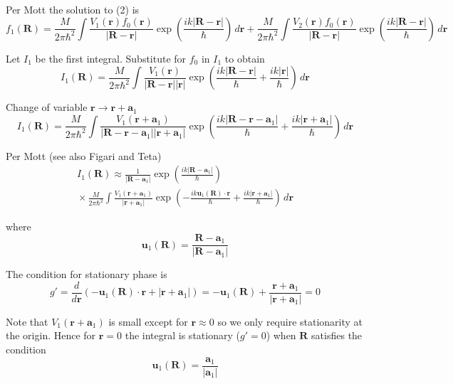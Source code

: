 Per Mott the solution to (2) is
\begin{equation*}
f_1(\mathbf R)=
\frac{M}{2\pi\hbar^2}\int\frac{V_1(\mathbf r)f_0(\mathbf r)}{|\mathbf R-\mathbf r|}
\exp\left(\frac{ik|\mathbf R-\mathbf r|}{\hbar}\right)\,d\mathbf r
+\frac{M}{2\pi\hbar^2}\int\frac{V_2(\mathbf r)f_0(\mathbf r)}{|\mathbf R-\mathbf r|}
\exp\left(\frac{ik|\mathbf R-\mathbf r|}{\hbar}\right)\,d\mathbf r
\end{equation*}

Let $I_1$ be the first integral.
Substitute for $f_0$ in $I_1$ to obtain
\begin{equation*}
I_1(\mathbf R)=
\frac{M}{2\pi\hbar^2}\int\frac{V_1(\mathbf r)}{|\mathbf R-\mathbf r||\mathbf r|}
\exp\left(\frac{ik|\mathbf R-\mathbf r|}{\hbar}+\frac{ik|\mathbf r|}{\hbar}\right)\,d\mathbf r
\end{equation*}

Change of variable $\mathbf r\rightarrow\mathbf r+\mathbf a_1$
\begin{equation*}
I_1(\mathbf R)=
\frac{M}{2\pi\hbar^2}
\int
\frac{V_1(\mathbf r+\mathbf a_1)}{|\mathbf R-\mathbf r-\mathbf a_1||\mathbf r+\mathbf a_1|}
\exp\left(
\frac{ik|\mathbf R-\mathbf r-\mathbf a_1|}{\hbar}+\frac{ik|\mathbf r+\mathbf a_1|}{\hbar}
\right)\,d\mathbf r
\end{equation*}

Per Mott (see also Figari and Teta)
\begin{multline*}
I_1(\mathbf R)\approx\frac{1}{|\mathbf R-\mathbf a_1|}
\exp\left(\frac{ik|\mathbf R-\mathbf a_1|}{\hbar}\right)
\\
{}\times\frac{M}{2\pi\hbar^2}
\int
\frac{V_1(\mathbf r+\mathbf a_1)}{|\mathbf r+\mathbf a_1|}
\exp\left(-\frac{ik\mathbf u_1(\mathbf R)\cdot\mathbf r}{\hbar}
+\frac{ik|\mathbf r+\mathbf a_1|}{\hbar}\right)
\,d\mathbf r
\end{multline*}

where
\begin{equation*}
\mathbf u_1(\mathbf R)=\frac{\mathbf R-\mathbf a_1}{|\mathbf R-\mathbf a_1|}
\end{equation*}

The condition for stationary phase is
\begin{equation*}
g'=\frac{d}{d\mathbf r}\left(-\mathbf u_1(\mathbf R)\cdot\mathbf r+|\mathbf r+\mathbf a_1|\right)
=-\mathbf u_1(\mathbf R)+\frac{\mathbf r+\mathbf a_1}{|\mathbf r+\mathbf a_1|}=0
\end{equation*}

Note that $V_1(\mathbf r+\mathbf a_1)$ is small except for $\mathbf r\approx0$ so
we only require stationarity at the origin.
Hence for $\mathbf r=0$ the integral is stationary ($g'=0$)
when $\mathbf R$ satisfies the condition
\begin{equation*}
\mathbf u_1(\mathbf R)
=\frac{\mathbf a_1}{|\mathbf a_1|}
\end{equation*}

